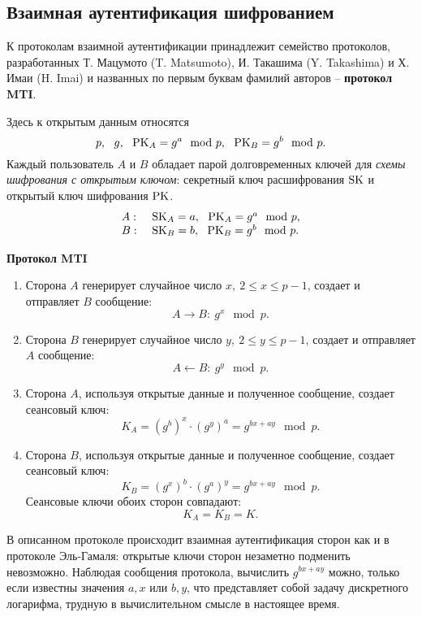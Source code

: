 \subsection{Взаимная аутентификация шифрованием}

К протоколам взаимной аутентификации принадлежит семейство протоколов, разработанных Т. Мацумото (T. Matsumoto), И. Такашима (Y. Takashima) и Х. Имаи (H. Imai) и названных по первым буквам фамилий авторов -- \textbf{протокол MTI}.

Здесь к открытым данным относятся
    \[ p, ~~ g, ~~ \textrm{PK}_A = g^a \mod p, ~~ \textrm{PK}_B = g^b \mod p. \]
Каждый пользователь $A$ и $B$ обладает парой долговременных ключей для \emph{схемы шифрования с открытым ключом}: секретный ключ расшифрования $\textrm{SK}$ и открытый ключ шифрования  $\textrm{PK}$.
\[ \begin{array}{ll}
    A: & ~ \textrm{SK}_A = a, ~~ \textrm{PK}_A = g^a \mod p, \\
    B: & ~ \textrm{SK}_B = b, ~~ \textrm{PK}_B = g^b \mod p. \\
\end{array} \]

\textbf{Протокол MTI}
\begin{enumerate}
    \item Сторона $A$ генерирует случайное число $x, ~ 2\leq x\leq p-1$, создает и отправляет $B$ сообщение:
        \[ A \rightarrow B: ~ g^x \mod p. \]
    \item Сторона $B$ генерирует случайное число $y, ~ 2\leq y\leq p-1$, создает и отправляет $A$ сообщение:
        \[ A \leftarrow B: ~ g^y \mod p. \]
    \item Сторона $A$, используя открытые данные и полученное сообщение, создает сеансовый ключ:
        \[ K_A = (g^b)^x \cdot (g^y)^a = g^{bx+ay} \mod p. \]
    \item Сторона $B$, используя открытые данные и полученное сообщение, создает сеансовый ключ:
        \[ K_B = (g^x)^b \cdot (g^a)^y = g^{bx+ay} \mod p. \]
        Сеансовые ключи обоих сторон совпадают:
        \[ K_{A} =K_{B} = K. \]
\end{enumerate}

В описанном протоколе происходит взаимная аутентификация сторон как и в протоколе Эль-Гамаля: открытые ключи сторон незаметно подменить невозможно. Наблюдая сообщения протокола, вычислить $g^{bx+ay}$ можно, только если известны значения $a,x$ или $b,y$, что представляет собой задачу дискретного логарифма, трудную в вычислительном смысле в настоящее время.
